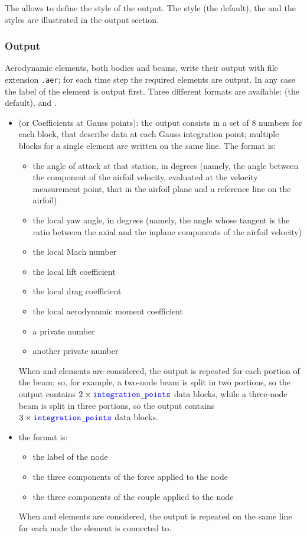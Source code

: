 The  allows to define the style of the output.
The  style (the default), the  and the 
styles are illustrated in the output section.


\subsubsection{Output}
Aerodynamic elements, both bodies and beams, write their output with file
extension \texttt{.aer}; for each time step the required elements are output.
In any case the label of the element is output first.
Three different formats are available:  (the default),
 and .

\begin{itemize}
\item[\kw{std}] (or Coefficients at Gauss points):
the output consists in a set of 8 numbers
for each block, that describe data at each Gauss integration point;
multiple blocks for a single element are written on the same line.
The format is:
\begin{itemize}
    \item the angle of attack at that station, in degrees
	(namely, the angle between the component of the airfoil velocity,
	evaluated at the velocity measurement point, that in the airfoil
	plane and a reference line on the airfoil)
    \item the local yaw angle, in degrees
	(namely, the angle whose tangent is the ratio
	between the axial and the inplane components of the airfoil
	velocity)
    \item the local Mach number
    \item the local lift coefficient
    \item the local drag coefficient
    \item the local aerodynamic moment coefficient
    \item a private number
    \item another private number
\end{itemize}
When  and  elements are considered,
the output is repeated for each portion of the beam; so, for example,
a two-node beam is split in two portions, so the output
contains $2\times \textcolor{blue}{\texttt{integration\_points}}$ data blocks,
while a three-node beam is split in three portions,
so the output contains $3\times \textcolor{blue}{\texttt{integration\_points}}$ data blocks.

\item[\kw{node}:]
the format is:
\begin{itemize}
    \item the label of the node
    \item the three components of the force applied to the node
    \item the three components of the couple applied to the node
\end{itemize}
When  and  elements are considered,
the output is repeated on the same line for each node
the element is connected to.


\end{itemize}

